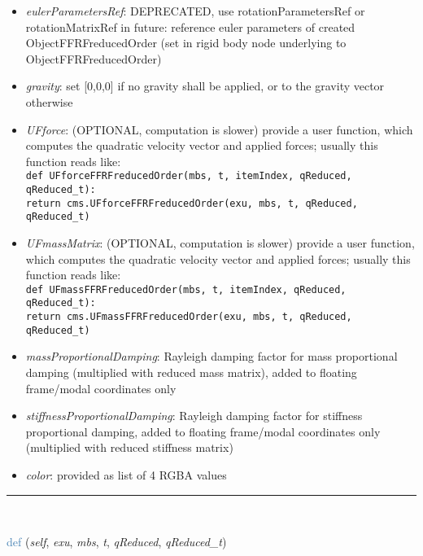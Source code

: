 \begin{itemize}[leftmargin=1.4cm]
\begin{itemize}[leftmargin=1.4cm]
\begin{itemize}[leftmargin=0.5cm]
\begin{itemize}[leftmargin=1.4cm]
\begin{itemize}[leftmargin=1.4cm]
\begin{itemize}[leftmargin=0.5cm]
\begin{itemize}[leftmargin=0.7cm]
\begin{itemize}[leftmargin=1.2cm]
    \item[] {\it   eulerParametersRef}: DEPRECATED, use rotationParametersRef or rotationMatrixRef in future: reference euler parameters of created ObjectFFRFreducedOrder (set in rigid body node underlying to ObjectFFRFreducedOrder)
    \item[] {\it   gravity}: set [0,0,0] if no gravity shall be applied, or to the gravity vector otherwise
    \item[] {\it   UFforce}: (OPTIONAL, computation is slower) provide a user function, which computes the quadratic velocity vector and applied forces; usually this function reads like:\\ \texttt{def UFforceFFRFreducedOrder(mbs, t, itemIndex, qReduced, qReduced\_t):\\ \phantom{XXXX}return cms.UFforceFFRFreducedOrder(exu, mbs, t, qReduced, qReduced\_t)}
    \item[] {\it   UFmassMatrix}: (OPTIONAL, computation is slower) provide a user function, which computes the quadratic velocity vector and applied forces; usually this function reads like:\\ \texttt{def UFmassFFRFreducedOrder(mbs, t, itemIndex, qReduced, qReduced\_t):\\  \phantom{XXXX}return cms.UFmassFFRFreducedOrder(exu, mbs, t, qReduced, qReduced\_t)}
    \item[] {\it   massProportionalDamping}: Rayleigh damping factor for mass proportional damping (multiplied with reduced mass matrix), added to floating frame/modal coordinates only
    \item[] {\it   stiffnessProportionalDamping}: Rayleigh damping factor for stiffness proportional damping, added to floating frame/modal coordinates only (multiplied with reduced stiffness matrix)
    \item[] {\it   color}: provided as list of 4 RGBA values
  \end{itemize}
\vspace{12pt}\end{itemize}
%
\noindent\rule{8cm}{0.75pt}\vspace{1pt} \\ 
\begin{flushleft}
\noindent \textcolor{steelblue}{def {\bf {}}}\label{sec:FEM:ObjectFFRFreducedOrderInterface:UFmassFFRFreducedOrder}
({\it self}, {\it exu}, {\it mbs}, {\it t}, {\it qReduced}, {\it qReduced\_t})

\end{flushleft}
\end{itemize}
\end{itemize}
\end{itemize}
\end{itemize}
\end{itemize}
\end{itemize}
